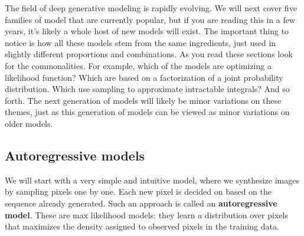 
The field of deep generative modeling is rapidly evolving. We will next cover five families of model that are currently popular, but if you are reading this in a few years, it's likely a whole host of new models will exist. The important thing to notice is how all these models stem from the same ingredients, just used in slightly different proportions and combinations. As you read these sections look for the commonalities. For example, which of the models are optimizing a likelihood function? Which are based on a factorization of a joint probability distribution. Which use sampling to approximate intractable integrals? And so forth. The next generation of models will likely be minor variations on these themes, just as this generation of models can be viewed as minor variations on older models.%

\subsection{Autoregressive models}
We will start with a very simple and intuitive model, where we synthesize images by sampling pixels one by one. Each new pixel is decided on based on the sequence already generated. Such an approach is called an {\bf autoregressive model}. These are max likelihood models: they learn a distribution over pixels that maximizes the density assigned to observed pixels in the training data. 

